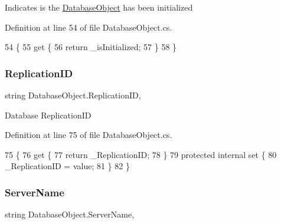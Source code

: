Indicates is the \mbox{\hyperlink{class_database_object}{Database\+Object}} has been initialized 



Definition at line 54 of file Database\+Object.\+cs.


\begin{DoxyCode}
54                               \{
55         \textcolor{keyword}{get} \{
56             \textcolor{keywordflow}{return} \_isInitialized;
57         \}
58     \}
\end{DoxyCode}
\mbox{\label{class_database_object_aaa091ee1a9a86d2d10fe2381ee2d1f4c}} 
\subsubsection{\texorpdfstring{Replication\+ID}{ReplicationID}}
{\footnotesize\ttfamily string Database\+Object.\+Replication\+ID\hspace{0.3cm}{\ttfamily [get]}, {\ttfamily [set]}}



Database Replication\+ID 



Definition at line 75 of file Database\+Object.\+cs.


\begin{DoxyCode}
75                                 \{
76         \textcolor{keyword}{get} \{
77             \textcolor{keywordflow}{return} \_ReplicationID;
78         \}
79         \textcolor{keyword}{protected} \textcolor{keyword}{internal} \textcolor{keyword}{set} \{
80             \_ReplicationID = value;
81         \}
82     \}
\end{DoxyCode}
\mbox{\label{class_database_object_ad6bfcd30152f7a115ac5a1c7fbfa9fcb}} 
\subsubsection{\texorpdfstring{Server\+Name}{ServerName}}
{\footnotesize\ttfamily string Database\+Object.\+Server\+Name\hspace{0.3cm}{\ttfamily [get]}, {\ttfamily [set]}}



